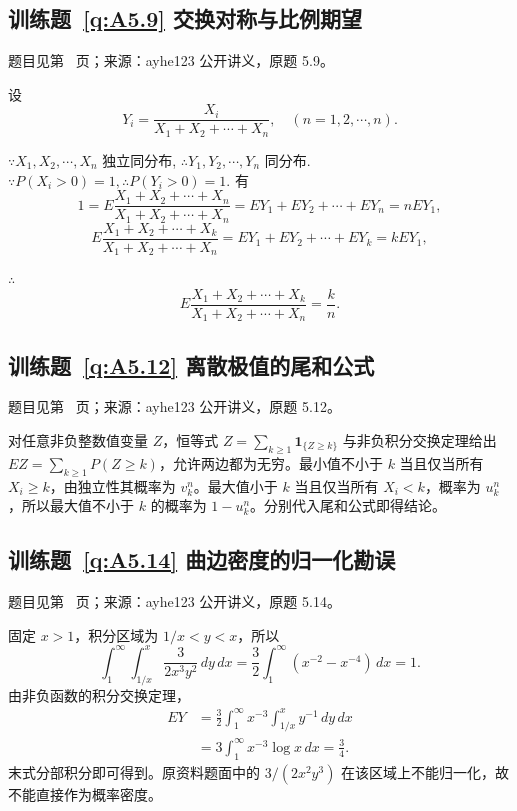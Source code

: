 \documentclass[UTF8,12pt,a4paper,fontset=fandol]{ctexbook}
\begin{document}
\subsection*{训练题~\ref{q:A5.9} 交换对称与比例期望}\label{a:A5.9}{\small 题目见第~\pageref{q:A5.9} 页；来源：ayhe123 公开讲义，原题 5.9。}
\begin{solve}
    设
    \[Y_i=\dfrac{X_i}{X_1+X_2+\cdots+X_n},\quad (n=1,2,\cdots,n).\]
    
    $\because X_1,X_2,\cdots,X_n$ 独立同分布, $\therefore Y_1,Y_2,\cdots,Y_n$ 同分布. $\because P(X_i>0)=1,\therefore P(Y_i>0)=1$. 有
    \[1=E\dfrac{X_1+X_2+\cdots+X_n}{X_1+X_2+\cdots+X_n}=EY_1+EY_2+\cdots+EY_n=nEY_1,\]
    \[E\dfrac{X_1+X_2+\cdots+X_k}{X_1+X_2+\cdots+X_n}=EY_1+EY_2+\cdots+EY_k=kEY_1,\]

    $\therefore$
    \[E\dfrac{X_1+X_2+\cdots+X_k}{X_1+X_2+\cdots+X_n}=\dfrac{k}{n}.\]
\end{solve}

\subsection*{训练题~\ref{q:A5.12} 离散极值的尾和公式}\label{a:A5.12}{\small 题目见第~\pageref{q:A5.12} 页；来源：ayhe123 公开讲义，原题 5.12。}
\begin{solve}对任意非负整数值变量 $Z$，恒等式 $Z=\sum_{k\ge1}\mathbf1_{\{Z\ge k\}}$ 与非负积分交换定理给出 $EZ=\sum_{k\ge1}P(Z\ge k)$，允许两边都为无穷。最小值不小于 $k$ 当且仅当所有 $X_i\ge k$，由独立性其概率为 $v_k^n$。最大值小于 $k$ 当且仅当所有 $X_i<k$，概率为 $u_k^n$，所以最大值不小于 $k$ 的概率为 $1-u_k^n$。分别代入尾和公式即得结论。\end{solve}

\subsection*{训练题~\ref{q:A5.14} 曲边密度的归一化勘误}\label{a:A5.14}{\small 题目见第~\pageref{q:A5.14} 页；来源：ayhe123 公开讲义，原题 5.14。}
\begin{solve}固定 $x>1$，积分区域为 $1/x<y<x$，所以\[\int_1^\infty\!\int_{1/x}^{x}\frac{3}{2x^3y^2}\,dy\,dx=\frac32\int_1^\infty(x^{-2}-x^{-4})\,dx=1.\]由非负函数的积分交换定理，\[\begin{aligned}EY&=\frac32\int_1^\infty x^{-3}\!\int_{1/x}^x y^{-1}\,dy\,dx\\&=3\int_1^\infty x^{-3}\log x\,dx=\frac34.\end{aligned}\]末式分部积分即可得到。原资料题面中的 $3/(2x^2y^3)$ 在该区域上不能归一化，故不能直接作为概率密度。\end{solve}
\end{document}
